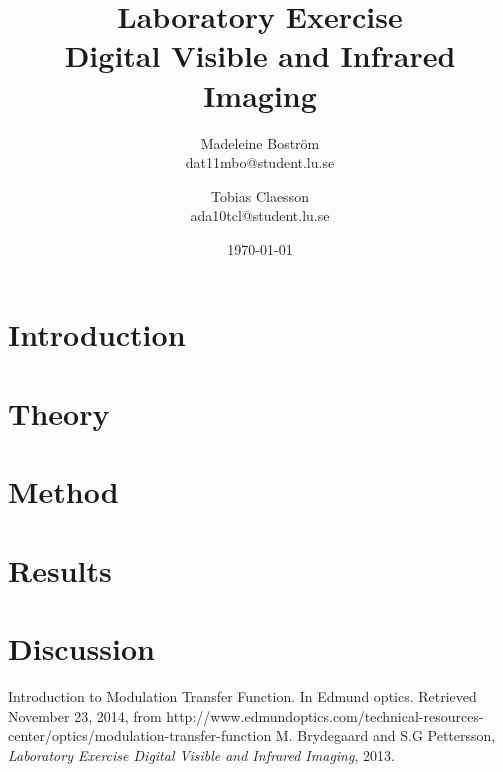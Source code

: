 \documentclass[a4paper]{article}
\begin{document}
\title{Laboratory Exercise \\Digital Visible and Infrared Imaging}
\author{
	Madeleine Bostr\"{o}m\\
	dat11mbo@student.lu.se
	\and
	Tobias Claesson\\
	ada10tcl@student.lu.se
}
\date{\today}
\maketitle


\section{Introduction}


\section{Theory}


\section{Method}


\section{Results}


\section{Discussion}


\clearpage

\begin{thebibliography}{count}
	Introduction to Modulation Transfer Function. In Edmund optics. Retrieved November 23, 2014, from  http://www.edmundoptics.com/technical-resources-center/optics/modulation-transfer-function
	M. Brydegaard and S.G Pettersson,
	\emph{Laboratory Exercise Digital Visible and Infrared Imaging}, 2013.
\end{thebibliography}
\end{document}
